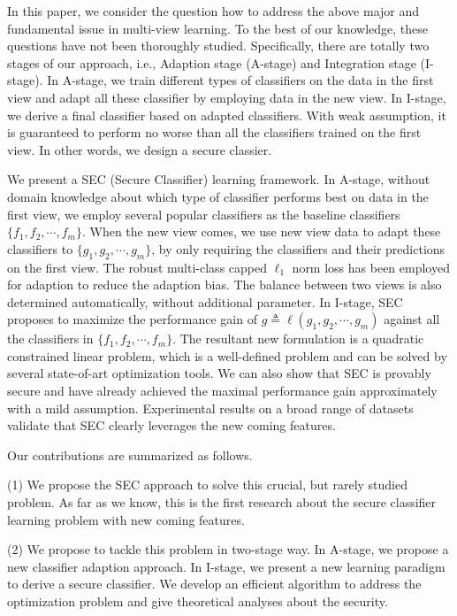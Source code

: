 \documentclass[10pt,journal,compsoc]{IEEEtran}
\begin{document}
In this paper, we consider the question how to address the above major and fundamental issue in multi-view learning. To the best of our knowledge, these questions have not been thoroughly studied. Specifically, there are totally two stages of our approach, i.e., Adaption stage (A-stage) and Integration stage (I-stage). In A-stage, we train different types of classifiers on the data in the first view and adapt all these classifier by employing data in the new view. In I-stage, we derive a final classifier based on adapted classifiers. With weak assumption, it is guaranteed to perform no worse than all the classifiers trained on the first view. In other words, we design a secure classier.

We present a SEC (Secure Classifier) learning framework. In A-stage, without domain knowledge about which type of classifier performs best on data in the first view, we employ several popular classifiers as the baseline classifiers $\{f_1, f_2, \cdots, f_m\}$. When the new view comes, we use new view data to adapt these classifiers to $\{g_1, g_2, \cdots, g_m\}$, by only requiring the classifiers and their predictions on the first view. The robust multi-class capped $\ell_1$ norm loss has been employed for adaption to reduce the adaption bias. The balance between two views is also determined automatically, without additional parameter. In I-stage, SEC proposes to maximize the performance gain of $g \triangleq \ell(g_1, g_2, \cdots, g_m)$ against all the classifiers in $\{f_1, f_2, \cdots, f_m\}$. The resultant new formulation is a quadratic constrained linear problem, which is a well-defined problem and can be solved by several state-of-art optimization tools. We can also show that SEC is provably secure and have already achieved the maximal performance gain approximately with a mild assumption. Experimental results on a broad range of datasets validate that SEC clearly leverages the new coming features.

Our contributions are summarized as follows.

(1) We propose the SEC approach to solve this crucial, but rarely studied problem. As far as we know, this is the first research about the secure classifier learning problem with new coming features.

(2) We propose to tackle this problem in two-stage way. In A-stage, we propose a new classifier adaption approach. In I-stage, we present a new learning paradigm to derive a secure classifier. We develop an efficient algorithm to address the optimization problem and give theoretical analyses about the security.
\end{document}
